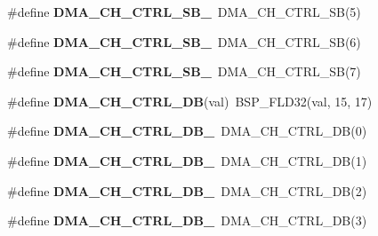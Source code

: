 \begin{DoxyCompactItemize}
\item 
\mbox{\label{group__lpc__dma_ga6d073afc35eb8bbaba51da86cfd0e662}} 
\#define {\bfseries D\+M\+A\+\_\+\+C\+H\+\_\+\+C\+T\+R\+L\+\_\+\+S\+B\+\_}~D\+M\+A\+\_\+\+C\+H\+\_\+\+C\+T\+R\+L\+\_\+\+SB(5)
\item 
\mbox{\label{group__lpc__dma_ga2a640bed90b7c3c0602b5f9e28ed6164}} 
\#define {\bfseries D\+M\+A\+\_\+\+C\+H\+\_\+\+C\+T\+R\+L\+\_\+\+S\+B\+\_}~D\+M\+A\+\_\+\+C\+H\+\_\+\+C\+T\+R\+L\+\_\+\+SB(6)
\item 
\mbox{\label{group__lpc__dma_gaa54b06b5a5abfd2f2a088f903209c727}} 
\#define {\bfseries D\+M\+A\+\_\+\+C\+H\+\_\+\+C\+T\+R\+L\+\_\+\+S\+B\+\_}~D\+M\+A\+\_\+\+C\+H\+\_\+\+C\+T\+R\+L\+\_\+\+SB(7)
\item 
\mbox{\label{group__lpc__dma_ga62c53d3756502edcf25b9f59e01e2518}} 
\#define {\bfseries D\+M\+A\+\_\+\+C\+H\+\_\+\+C\+T\+R\+L\+\_\+\+DB}(val)~B\+S\+P\+\_\+\+F\+L\+D32(val, 15, 17)
\item 
\mbox{\label{group__lpc__dma_gaac6c8c4c9bae9fea9c3bf9f0b187c02e}} 
\#define {\bfseries D\+M\+A\+\_\+\+C\+H\+\_\+\+C\+T\+R\+L\+\_\+\+D\+B\+\_}~D\+M\+A\+\_\+\+C\+H\+\_\+\+C\+T\+R\+L\+\_\+\+DB(0)
\item 
\mbox{\label{group__lpc__dma_gab0aa12592378082d772e247c9fb539d7}} 
\#define {\bfseries D\+M\+A\+\_\+\+C\+H\+\_\+\+C\+T\+R\+L\+\_\+\+D\+B\+\_}~D\+M\+A\+\_\+\+C\+H\+\_\+\+C\+T\+R\+L\+\_\+\+DB(1)
\item 
\mbox{\label{group__lpc__dma_ga9e26dd99ae09df6d2c1e63f0fce8542c}} 
\#define {\bfseries D\+M\+A\+\_\+\+C\+H\+\_\+\+C\+T\+R\+L\+\_\+\+D\+B\+\_}~D\+M\+A\+\_\+\+C\+H\+\_\+\+C\+T\+R\+L\+\_\+\+DB(2)
\item 
\mbox{\label{group__lpc__dma_ga7f92d17af47e3f60577a14c400e53a2d}} 
\#define {\bfseries D\+M\+A\+\_\+\+C\+H\+\_\+\+C\+T\+R\+L\+\_\+\+D\+B\+\_}~D\+M\+A\+\_\+\+C\+H\+\_\+\+C\+T\+R\+L\+\_\+\+DB(3)
\item 
\mbox{\label{group__lpc__dma_gae220a4c565903a957dec6eda528364a8}} 

\end{DoxyCompactItemize}
